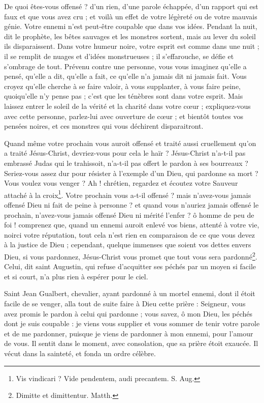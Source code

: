 \documentclass[instructions.tex]{subfiles}
\begin{document}
De quoi êtes-vous offensé ? d’un rien, d’une parole échappée, d’un rapport qui est faux et que vous avez cru ; et voilà un effet de votre légèreté ou de votre mauvais génie. Votre ennemi n’est peut-être coupable que dans vos idées. Pendant la nuit, dit le prophète, les bêtes sauvages et les monstres sortent, mais au lever du soleil ils disparaissent. Dans votre humeur noire, votre esprit est comme dans une nuit ; il se remplit de nuages et d’idées monstrueuses ; il s’effarouche, se défie et s’ombrage de tout. Prévenu contre une personne, vous vous imaginez qu’elle a pensé, qu’elle a dit, qu’elle a fait, ce qu’elle n’a jamais dit ni jamais fait. Vous croyez qu’elle cherche à se faire valoir, à vous supplanter, à vous faire peine, quoiqu’elle n’y pense pas ; c’est que les ténèbres sont dans votre esprit. Mais laissez entrer le soleil de la vérité et la charité dans votre cœur ; expliquez-vous avec cette personne, parlez-lui avec ouverture de cœur ; et bientôt toutes vos pensées noires, et ces monstres qui vous déchirent disparaitront.
 
Quand même votre prochain vous auroit offensé et traité aussi cruellement qu’on a traité Jésus-Christ, devriez-vous pour cela le haïr ? Jésus-Christ n’a-t-il pas embrassé Judas qui le trahissoit, n’a-t-il pas offert le pardon à ses bourreaux ? Seriez-vous assez dur pour résister à l’exemple d’un Dieu, qui pardonne sa mort ? Vous voulez vous venger ? Ah ! chrétien, regardez et écoutez votre Sauveur attaché à la croix\footnote{Vis vindicari ? Vide pendentem, audi precantem. S. Aug.}. Votre prochain vous a-t-il offensé ? mais n’avez-vous jamais offensé Dieu ni fait de peine à personne ? et quand vous n’auriez jamais offensé le prochain, n’avez-vous jamais offensé Dieu ni mérité l’enfer ? ô homme de peu de foi ! comprenez que, quand un ennemi auroit enlevé vos biens, attenté à votre vie, noirci votre réputation, tout cela n’est rien en comparaison de ce que vous devez à la justice de Dieu ; cependant, quelque immenses que soient vos dettes envers Dieu, si vous pardonnez, Jésus-Christ vous promet que tout vous sera pardonné\footnote{Dimitte et dimittentur. Matth.}. Celui, dit saint Augustin, qui refuse d’acquitter ses péchés par un moyen si facile et si court, n’a plus rien à espérer pour le ciel.
 
Saint Jean Gualbert, chevalier, ayant pardonné à un mortel ennemi, dont il étoit facile de se venger, alla tout de suite faire à Dieu cette prière : Seigneur, vous avez promis le pardon à celui qui pardonne ; vous savez, ô mon Dieu, les péchés dont je suis coupable : je viens vous supplier et vous sommer de tenir votre parole et de me pardonner, puisque je viens de pardonner à mon ennemi, pour l’amour de vous. Il sentit dans le moment, avec consolation, que sa prière étoit exaucée. Il vécut dans la sainteté, et fonda un ordre célèbre.
 
\end{document}
